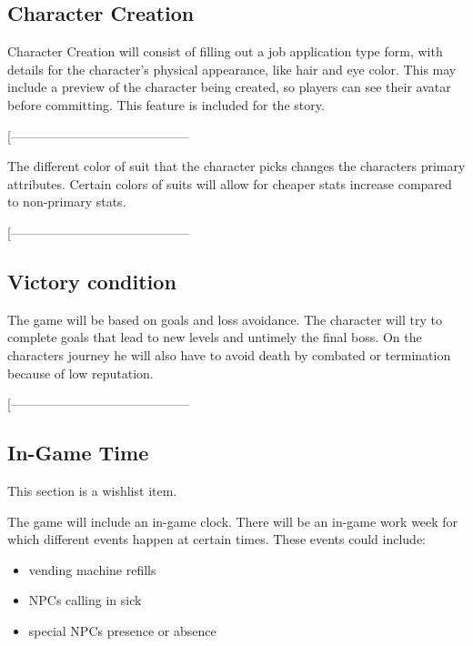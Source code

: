 \documentclass[9pt]{article}
\begin{document}
\subsection*{Character Creation}
Character Creation will consist of filling out a job application type form, 
with details for the character's physical appearance, like hair and eye color. 
This may include a preview of the character being created, so players can see
their avatar before committing. This feature is included for the story. 


\smallskip
[------------------------------------------
\smallskip

The different color of suit that the character picks changes the characters primary attributes. Certain colors of suits will allow for cheaper stats increase compared to non-primary stats.

\smallskip
[------------------------------------------
















\subsection*{Victory condition}


The game will be based on goals and loss avoidance. The character will try to complete goals that lead to new levels and untimely the final boss. On the characters journey he will also have to avoid death by combated or termination because of low reputation.

\smallskip
[------------------------------------------
















\subsection*{In-Game Time}
This section is a wishlist item. 

The game will include an in-game clock. There will be an in-game work week
for which different events happen at certain times. These events could include:
\begin{itemize}
\item vending machine refills
\item NPCs calling in sick 
\item special NPCs presence or absence
\end{itemize}
\end{document}
